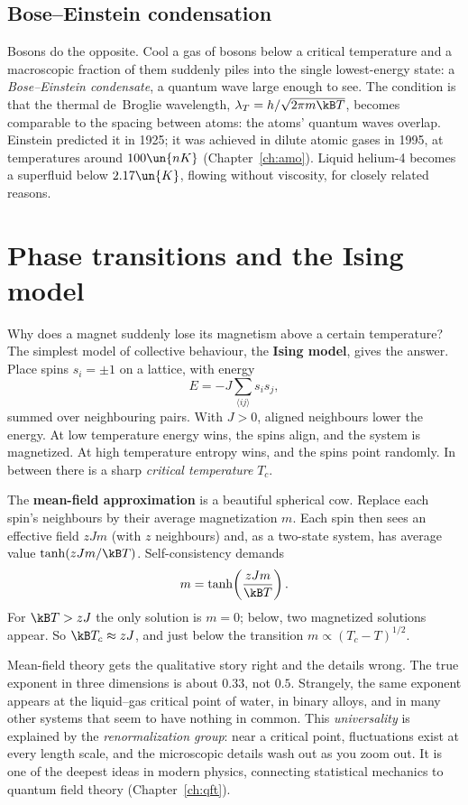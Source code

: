 \subsection{Bose--Einstein condensation}
Bosons do the opposite. Cool a gas of bosons below a critical temperature and a macroscopic fraction of them suddenly piles into the single lowest-energy state: a \emph{Bose--Einstein condensate}, a quantum wave large enough to see. The condition is that the thermal de~Broglie wavelength, $\lambda_T = h/\sqrt{2\pi m\kB T}$, becomes comparable to the spacing between atoms: the atoms' quantum waves overlap. Einstein predicted it in 1925; it was achieved in dilute atomic gases in 1995, at temperatures around $100\un{nK}$ (Chapter~\ref{ch:amo}). Liquid helium-4 becomes a superfluid below $2.17\un{K}$, flowing without viscosity, for closely related reasons.

\section{Phase transitions and the Ising model}

Why does a magnet suddenly lose its magnetism above a certain temperature? The simplest model of collective behaviour, the \textbf{Ising model}, gives the answer. Place spins $s_i = \pm1$ on a lattice, with energy
\[
  E = -J\sum_{\langle ij\rangle}s_is_j,
\]
summed over neighbouring pairs. With $J>0$, aligned neighbours lower the energy. At low temperature energy wins, the spins align, and the system is magnetized. At high temperature entropy wins, and the spins point randomly. In between there is a sharp \emph{critical temperature} $T_c$.

The \textbf{mean-field approximation} is a beautiful spherical cow. Replace each spin's neighbours by their average magnetization $m$. Each spin then sees an effective field $zJm$ (with $z$ neighbours) and, as a two-state system, has average value $\tanh(zJm/\kB T)$. Self-consistency demands
\[
  m = \tanh\!\left(\frac{zJm}{\kB T}\right).
\]
For $\kB T > zJ$ the only solution is $m=0$; below, two magnetized solutions appear. So $\kB T_c\approx zJ$, and just below the transition $m\propto(T_c - T)^{1/2}$.

Mean-field theory gets the qualitative story right and the details wrong. The true exponent in three dimensions is about $0.33$, not $0.5$. Strangely, the same exponent appears at the liquid--gas critical point of water, in binary alloys, and in many other systems that seem to have nothing in common. This \emph{universality} is explained by the \emph{renormalization group}: near a critical point, fluctuations exist at every length scale, and the microscopic details wash out as you zoom out. It is one of the deepest ideas in modern physics, connecting statistical mechanics to quantum field theory (Chapter~\ref{ch:qft}).

